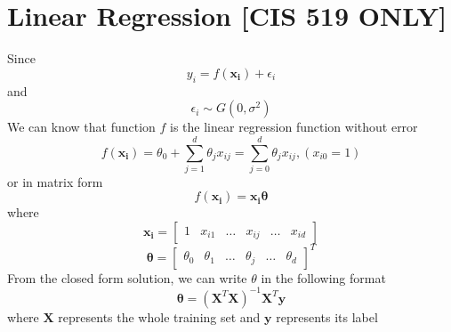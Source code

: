 \documentclass{article}
\begin{document}
       \section{Linear Regression [CIS 519 ONLY]}
       	Since 
       	\begin{equation}
       		y_i=f(\boldsymbol{x_i})+\epsilon_i
       	\end{equation}
       	and
       	\begin{equation}
        	\epsilon_i \sim G(0, \sigma^2)
       	\end{equation}
       	We can know that function $f$ is the linear regression function without error
       	\begin{equation}
       		f(\boldsymbol{x_i})= \theta_0+\sum_{j=1}^{d}\theta_j x_{ij}=\sum_{j=0}^{d}\theta_j x_{ij}, (x_{i0}=1)       
       	\end{equation}
       	or in matrix form
       	\begin{equation}\label{eq:reg}
       		f(\boldsymbol{x_i})=\boldsymbol{x_i}\boldsymbol{\theta}
       	\end{equation}
       	where
       	\begin{equation}
       		\boldsymbol{x_i} = \begin{bmatrix} 
    			1&x_{i1}&\dots&x_{ij}&\dots&x_{id}
    			\end{bmatrix}
    	\end{equation}
    	\begin{equation}
       		\boldsymbol{\theta} = \begin{bmatrix} 
    			\theta_0&\theta_1&\dots&\theta_j&\dots&\theta_d
    			\end{bmatrix}^T
       	\end{equation}
       	From the closed form solution, we can write $\theta$ in the following format
       	\begin{equation}\label{eq:close}
       		\boldsymbol{\theta} = (\boldsymbol{X}^T\boldsymbol{X})^{-1}\boldsymbol{X}^T\boldsymbol{y}
       	\end{equation}
       	where $\boldsymbol{X}$ represents the whole training set and $\boldsymbol{y}$ represents its label
\end{document}
